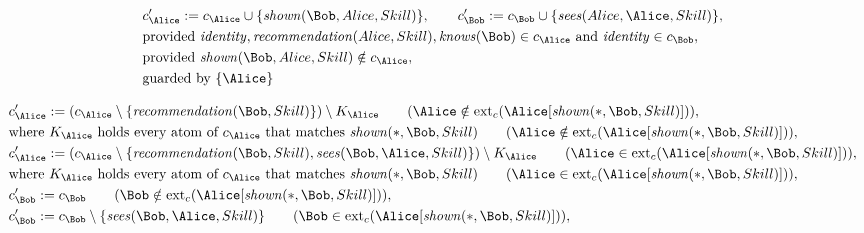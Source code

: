 \begin{align*}
&
c'_
{
\Alice
}
 := 
c_
{
\Alice
}
 \cup 
\{
\mathit{\detokenize{
shown
}}
(
\Bob
,
Alice
,
Skill
)
\}
, \qquad 
c'_
{
\Bob
}
 := 
c_
{
\Bob
}
 \cup 
\{
\mathit{\detokenize{
sees
}}
(
Alice
,
\Alice
,
Skill
)
\}
,\\
&
\text{provided } 
\mathit{\detokenize{
identity
}}
,
\mathit{\detokenize{
recommendation
}}
(
Alice
,
Skill
)
,
\mathit{\detokenize{
knows
}}
(
\Bob
)
 \in c_
{
\Alice
}
 \text{ and } 
\mathit{\detokenize{
identity
}}
 \in c_
{
\Bob
}
,\\
&
\text{provided } 
\mathit{\detokenize{
shown
}}
(
\Bob
,
Alice
,
Skill
)
 \notin c_
{
\Alice
}
,\\
&
\text{guarded by } \{
\Alice
\}
\end{align*}

\begin{align*}
&
c'_
{
\Alice
}
 := 
(c_
{
\Alice
}
 \setminus 
\{
\mathit{\detokenize{
recommendation
}}
(
\Bob
,
Skill
)
\}
) \setminus K_
{
\Alice
}
 \qquad (
\Alice
 \notin 
\mathrm{ext}_c(
\Alice
[
\mathit{\detokenize{
shown
}}
(
\ast
,
\Bob
,
Skill
)
]
)
)
,\\
&
\text{where } K_
{
\Alice
}
 \text{ holds every atom of } c_
{
\Alice
}
 \text{ that matches } 
\mathit{\detokenize{
shown
}}
(
\ast
,
\Bob
,
Skill
)
 \qquad (
\Alice
 \notin 
\mathrm{ext}_c(
\Alice
[
\mathit{\detokenize{
shown
}}
(
\ast
,
\Bob
,
Skill
)
]
)
)
,\\
&
c'_
{
\Alice
}
 := 
(c_
{
\Alice
}
 \setminus 
\{
\mathit{\detokenize{
recommendation
}}
(
\Bob
,
Skill
)
,
\mathit{\detokenize{
sees
}}
(
\Bob
,
\Alice
,
Skill
)
\}
) \setminus K_
{
\Alice
}
 \qquad (
\Alice
 \in 
\mathrm{ext}_c(
\Alice
[
\mathit{\detokenize{
shown
}}
(
\ast
,
\Bob
,
Skill
)
]
)
)
,\\
&
\text{where } K_
{
\Alice
}
 \text{ holds every atom of } c_
{
\Alice
}
 \text{ that matches } 
\mathit{\detokenize{
shown
}}
(
\ast
,
\Bob
,
Skill
)
 \qquad (
\Alice
 \in 
\mathrm{ext}_c(
\Alice
[
\mathit{\detokenize{
shown
}}
(
\ast
,
\Bob
,
Skill
)
]
)
)
,\\
&
c'_
{
\Bob
}
 := 
c_
{
\Bob
}
 \qquad (
\Bob
 \notin 
\mathrm{ext}_c(
\Alice
[
\mathit{\detokenize{
shown
}}
(
\ast
,
\Bob
,
Skill
)
]
)
)
,\\
&
c'_
{
\Bob
}
 := 
c_
{
\Bob
}
 \setminus 
\{
\mathit{\detokenize{
sees
}}
(
\Bob
,
\Alice
,
Skill
)
\}
 \qquad (
\Bob
 \in 
\mathrm{ext}_c(
\Alice
[
\mathit{\detokenize{
shown
}}
(
\ast
,
\Bob
,
Skill
)
]
)
)
,\\

\end{align*}
